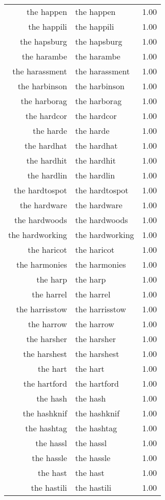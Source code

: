 \begin{table}[ht]
\begin{tabular}{rlr}
  the happen & the happen & 1.00 \\ 
  the happili & the happili & 1.00 \\ 
  the hapsburg & the hapsburg & 1.00 \\ 
  the harambe & the harambe & 1.00 \\ 
  the harassment & the harassment & 1.00 \\ 
  the harbinson & the harbinson & 1.00 \\ 
  the harborag & the harborag & 1.00 \\ 
  the hardcor & the hardcor & 1.00 \\ 
  the harde & the harde & 1.00 \\ 
  the hardhat & the hardhat & 1.00 \\ 
  the hardhit & the hardhit & 1.00 \\ 
  the hardlin & the hardlin & 1.00 \\ 
  the hardtospot & the hardtospot & 1.00 \\ 
  the hardware & the hardware & 1.00 \\ 
  the hardwoods & the hardwoods & 1.00 \\ 
  the hardworking & the hardworking & 1.00 \\ 
  the haricot & the haricot & 1.00 \\ 
  the harmonies & the harmonies & 1.00 \\ 
  the harp & the harp & 1.00 \\ 
  the harrel & the harrel & 1.00 \\ 
  the harrisstow & the harrisstow & 1.00 \\ 
  the harrow & the harrow & 1.00 \\ 
  the harsher & the harsher & 1.00 \\ 
  the harshest & the harshest & 1.00 \\ 
  the hart & the hart & 1.00 \\ 
  the hartford & the hartford & 1.00 \\ 
  the hash & the hash & 1.00 \\ 
  the hashknif & the hashknif & 1.00 \\ 
  the hashtag & the hashtag & 1.00 \\ 
  the hassl & the hassl & 1.00 \\ 
  the hassle & the hassle & 1.00 \\ 
  the hast & the hast & 1.00 \\ 
  the hastili & the hastili & 1.00 \\ 

\end{tabular}
\end{table}
